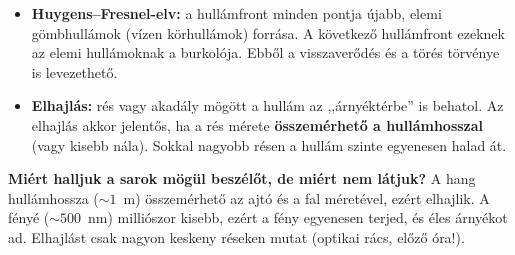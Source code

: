 \documentclass[12pt]{article}
\begin{document}
\begin{minipage}[t]{0.52\linewidth}\vspace{0pt}
\begin{itemize}
  \item \textbf{Huygens--Fresnel-elv:} a hullámfront minden pontja újabb, elemi gömbhullámok
    (vízen körhullámok) forrása. A következő hullámfront ezeknek az elemi hullámoknak a
    burkolója. Ebből a visszaverődés és a törés törvénye is levezethető.
  \item \textbf{Elhajlás:} rés vagy akadály mögött a hullám az ,,árnyéktérbe'' is behatol.
    Az elhajlás akkor jelentős, ha a rés mérete \textbf{összemérhető a hullámhosszal}
    (vagy kisebb nála). Sokkal nagyobb résen a hullám szinte egyenesen halad át.
\end{itemize}
\begin{fontos}
\textbf{Miért halljuk a sarok mögül beszélőt, de miért nem látjuk?} A hang hullámhossza
($\sim 1$~m) összemérhető az ajtó és a fal méretével, ezért elhajlik. A fényé
($\sim 500$~nm) milliószor kisebb, ezért a fény egyenesen terjed, és éles árnyékot
ad. Elhajlást csak nagyon keskeny réseken mutat (optikai rács, előző óra!).
\end{fontos}
\end{minipage}\hfill
\begin{minipage}[t]{0.45\linewidth}\vspace{0pt}\centering
{}

\vspace{10pt}
\end{minipage}
\end{document}
